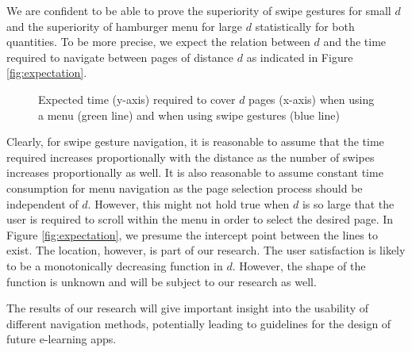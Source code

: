 \documentclass{sig-alternate-05-2015}
\begin{document}
We are confident to be able to prove the superiority of swipe gestures for small $d$ and the superiority of hamburger menu for large $d$ statistically for both quantities. 
To be more precise, we expect the relation between $d$ and the time required to navigate between pages of distance $d$ as indicated in Figure \ref{fig:expectation}.
\begin{figure}
\caption{Expected time (y-axis) required to cover $d$ pages (x-axis) when using a menu (green line) and when using swipe gestures (blue line)}
\end{figure}
Clearly, for swipe gesture navigation, it is reasonable to assume that the time required increases proportionally with the distance as the number of swipes increases proportionally as well.
It is also reasonable to assume constant time consumption for menu navigation as the page selection process should be independent of $d$. However, this might not hold true when $d$ is so large that
the user is required to scroll within the menu in order to select the desired page. In Figure \ref{fig:expectation}, we presume the intercept point between the lines to exist. The location, however,
is part of our research.
The user satisfaction is likely to be a monotonically decreasing function in $d$. However, the shape of the function is unknown and will be subject to our research as well.

The results of our research will give important insight into the usability of different navigation methods, potentially leading to guidelines for the design of future e-learning apps.
\end{document}
